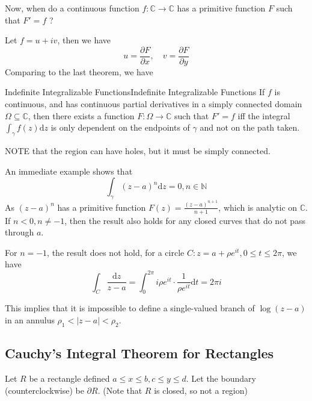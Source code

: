 \documentclass[../main.tex]{subfiles}
\begin{document}
Now, when do a continuous function $f: \mathbb{C}\rightarrow \mathbb{C}$ has a primitive function $F$ such that $F'=f$ ?

Let $f=u+iv$, then we have
\begin{equation*}
	u = \frac{\partial F}{\partial x}, \quad v = \frac{\partial F}{\partial y}
\end{equation*}
Comparing to the last theorem, we have
\begin{theorem}{Indefinite Integralizable Functions}{Indefinite Integralizable Functions}
	If $f$ is continuous, and has continuous partial derivatives in a simply connected domain $\Omega \subseteq \mathbb{C}$, then there exists a function $F: \Omega \rightarrow \mathbb{C}$ such that $F'=f$ iff the integral $\displaystyle \int_{\gamma} f(z) \mathrm{d} z$ is only dependent on the endpoints of $\gamma$ and not on the path taken.
\end{theorem}
NOTE that the region can have holes, but it must be simply connected.

An immediate example shows that
\begin{equation}
\int_{\gamma} (z-a)^n \mathrm{d} z = 0, n\in \mathbb{N}
\end{equation}
As $(z-a)^n$ has a primitive function $\displaystyle F(z) = \frac{(z-a)^{n+1}}{n+1}$, which is analytic on $\mathbb{C}$. If $n<0,n\neq -1$, then the result also holds for any closed curves that do not pass through $a$.

For $n=-1$, the result does not hold, for a circle $C: z=a+ \rho e^{it},0\leq t\leq 2 \pi$, we have
\begin{equation}
	\int_C \frac{\mathrm{d} z}{z-a} = \int_0^{2\pi} i \rho e^{it} \cdot \frac{1}{\rho e^{it}} \mathrm{d} t = 2 \pi i
\end{equation}
\begin{remark}
This implies that it is impossible to define a single-valued branch of $\log (z-a)$ in an annulus $\rho_1 < |z-a| < \rho_2$.
\end{remark}

\subsection{Cauchy's Integral Theorem for Rectangles}

Let $R$ be a rectangle defined $a\leq x\leq b,c\leq y\leq d$. Let the boundary (counterclockwise) be $\partial R$. (Note that $R$ is closed, so not a region)
\end{document}
